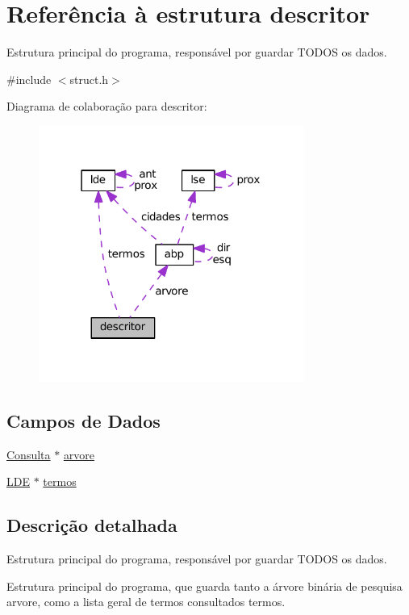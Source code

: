 \hypertarget{structdescritor}{}\section{Referência à estrutura descritor}
\label{structdescritor}


Estrutura principal do programa, responsável por guardar T\+O\+D\+OS os dados.  




{\ttfamily \#include $<$struct.\+h$>$}



Diagrama de colaboração para descritor\+:\nopagebreak
\begin{figure}[H]
\begin{center}
\leavevmode
\includegraphics[width=247pt]{structdescritor__coll__graph}
\end{center}
\end{figure}
\subsection*{Campos de Dados}
\begin{DoxyCompactItemize}
\item 
\hyperlink{struct_8h_a1664119ce88635d3bf4655a988ef8248}{Consulta} $\ast$ \hyperlink{structdescritor_a523b6d27352566be093cada88aa655d4}{arvore}
\item 
\hyperlink{struct_8h_ae030205799002e4fc414e374283d8598}{L\+DE} $\ast$ \hyperlink{structdescritor_a4f74c1b0743b541ef2b21dec4fa4da2e}{termos}
\end{DoxyCompactItemize}


\subsection{Descrição detalhada}
Estrutura principal do programa, responsável por guardar T\+O\+D\+OS os dados. 

Estrutura principal do programa, que guarda tanto a árvore binária de pesquisa {\ttfamily arvore}, como a lista geral de termos consultados {\ttfamily termos}. 
